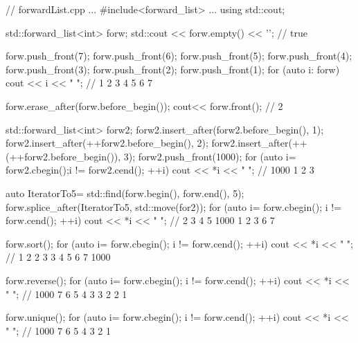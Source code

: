 \begin{cpp}
// forwardList.cpp
...
#include<forward_list>
...
using std::cout;

std::forward_list<int> forw;
std::cout << forw.empty() << '\n'; // true

forw.push_front(7);
forw.push_front(6);
forw.push_front(5);
forw.push_front(4);
forw.push_front(3);
forw.push_front(2);
forw.push_front(1);
for (auto i: forw) cout << i << " "; // 1 2 3 4 5 6 7

forw.erase_after(forw.before_begin());
cout<< forw.front(); // 2

std::forward_list<int> forw2;
forw2.insert_after(forw2.before_begin(), 1);
forw2.insert_after(++forw2.before_begin(), 2);
forw2.insert_after(++(++forw2.before_begin()), 3);
forw2.push_front(1000);
for (auto i= forw2.cbegin();i != forw2.cend(); ++i) cout << *i << " ";
	// 1000 1 2 3
	
auto IteratorTo5= std::find(forw.begin(), forw.end(), 5);
forw.splice_after(IteratorTo5, std::move(for2));
for (auto i= forw.cbegin(); i != forw.cend(); ++i) cout << *i << " ";
	// 2 3 4 5 1000 1 2 3 6 7

forw.sort();
for (auto i= forw.cbegin(); i != forw.cend(); ++i) cout << *i << " ";
	// 1 2 2 3 3 4 5 6 7 1000

forw.reverse();
for (auto i= forw.cbegin(); i != forw.cend(); ++i) cout << *i << " ";
	// 1000 7 6 5 4 3 3 2 2 1

forw.unique();
for (auto i= forw.cbegin(); i != forw.cend(); ++i) cout << *i << " ";
	// 1000 7 6 5 4 3 2 1
\end{cpp}














